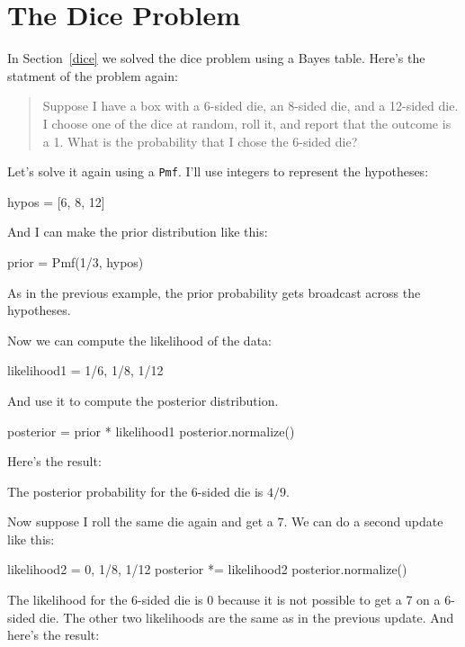 \documentclass[12pt]{book}
\theoremstyle{exercise}
\newcommand{\py}[1]{{\tt #1}}%
\begin{document}
\section{The Dice Problem}

In Section~\ref{dice} we solved the dice problem using a Bayes table.
Here's the statment of the problem again:

\begin{quote}
Suppose I have a box with a 6-sided die, an 8-sided die, and a 12-sided die.
I choose one of the dice at random, roll it, and report that the outcome is a 1.
What is the probability that I chose the 6-sided die?
\end{quote}

Let's solve it again using a \py{Pmf}.
I'll use integers to represent the hypotheses:

\begin{code}
hypos = [6, 8, 12]
\end{code}

And I can make the prior distribution like this:

\begin{code}
prior = Pmf(1/3, hypos)
\end{code}

As in the previous example, the prior probability gets broadcast across the hypotheses.

Now we can compute the likelihood of the data:

\begin{code}
likelihood1 = 1/6, 1/8, 1/12
\end{code}

And use it to compute the posterior distribution.

\begin{code}
posterior = prior * likelihood1
posterior.normalize()
\end{code}

Here's the result:



The posterior probability for the 6-sided die is $4/9$.

Now suppose I roll the same die again and get a $7$.
We can do a second update like this:

\begin{code}
likelihood2 = 0, 1/8, 1/12
posterior *= likelihood2
posterior.normalize()
\end{code}

The likelihood for the 6-sided die is $0$ because it is not possible to get a 7 on a 6-sided die.
The other two likelihoods are the same as in the previous update.
And here's the result:
\end{document}
